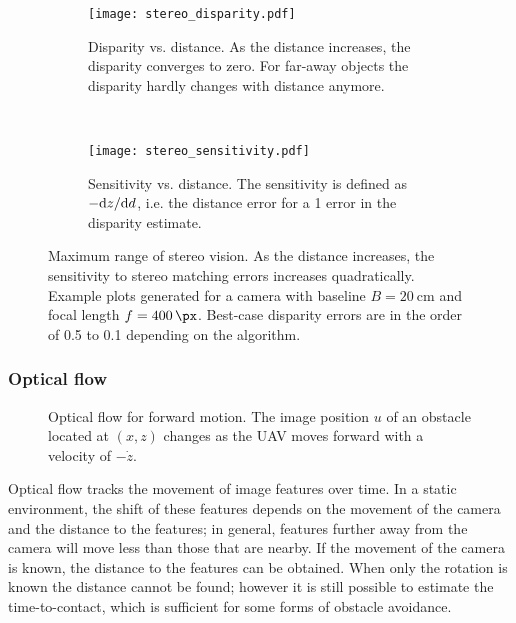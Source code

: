 \begin{figure}
\centering
\begin{subfigure}[t]{0.45\textwidth}
\texttt{[image: stereo\_disparity.pdf]}
\caption{Disparity vs. distance. As the distance increases, the disparity converges to zero. For far-away objects the disparity hardly changes with distance anymore.}
\end{subfigure}
~
\begin{subfigure}[t]{0.45\textwidth}
\texttt{[image: stereo\_sensitivity.pdf]}
\caption{Sensitivity vs. distance. The sensitivity is defined as $-\mathrm{d} z / \mathrm{d} d$, i.e. the distance error for a \SI{1}{\px} error in the disparity estimate.}
\end{subfigure}
\caption{Maximum range of stereo vision. As the distance increases, the sensitivity to stereo matching errors increases quadratically. Example plots generated for a camera with baseline $B=\SI{20}{\centi\meter}$ and focal length $f=\SI{400}{\px}$. Best-case disparity errors are in the order of \SI{0.5}{\px} to \SI{0.1}{\px} \cite{Pinggera2014} depending on the algorithm.}
\label{fig:stereo_lim}
\end{figure}





\subsubsection{Optical flow}
\begin{figure}
\centering

\caption{Optical flow for forward motion. The image position $u$ of an obstacle located at $(x, z)$ changes as the \ac{UAV} moves forward with a velocity of $-\dot z$.}
\label{fig:optical_flow}
\end{figure}

Optical flow tracks the movement of image features over time.
In a static environment, the shift of these features depends on the movement of the camera and the distance to the features; in general, features further away from the camera will move less than those that are nearby.
If the movement of the camera is known, the distance to the features can be obtained.
When only the rotation is known the distance cannot be found; however it is still possible to estimate the time-to-contact, which is sufficient for some forms of obstacle avoidance.

